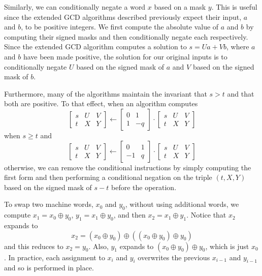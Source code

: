 \documentclass{ucalgthes1}
\theoremstyle{definition}
\newcommand{\matrixtt}[4]{\left[ \begin{array}{rr} #1 & #2 \\ #3 & #4 \end{array} \right]}
\newcommand{\matrixThreeTwo}[6]{\left[ \begin{array}{rrr} #1 & #2 & #3 \\ #4 & #5 & #6 \end{array} \right]}
\newcommand{\bxor}{\oplus}
\begin{document}
Similarly, we can conditionally negate a word $x$ based on a mask $y$.  This is useful since the extended GCD algorithms described previously expect their input, $a$ and $b$, to be positive integers.  We first compute the absolute value of $a$ and $b$ by computing their signed masks and then conditionally negate each respectively.  Since the extended GCD algorithm computes a solution to $s = Ua + Vb$, where $a$ and $b$ have been made positive, the solution for our original inputs is to conditionally negate $U$ based on the signed mask of $a$ and $V$ based on the signed mask of $b$.

Furthermore, many of the algorithms maintain the invariant that $s > t$ and that both are positive.  To that effect, when an algorithm computes
\[
 \matrixThreeTwo{s}{U}{V}{t}{X}{Y} \gets \matrixtt{0}{1}{1}{-q} \cdot \matrixThreeTwo{s}{U}{V}{t}{X}{Y}
\]
when $s \ge t$ and
\[
\matrixThreeTwo{s}{U}{V}{t}{X}{Y} \gets \matrixtt{0}{1}{-1}{q} \cdot \matrixThreeTwo{s}{U}{V}{t}{X}{Y}
\]
otherwise, we can remove the conditional instructions by simply computing the first form and then performing a conditional negation on the triple $(t, X, Y)$ based on the signed mask of $s-t$ before the operation.

To swap two machine words, $x_0$ and $y_0$, without using additional words, we compute $x_1 = x_0 \bxor y_0$, $y_1 = x_1 \bxor y_0$, and then $x_2 = x_1 \bxor y_1$.  Notice that $x_2$ expands to
\[
	x_2 = (x_0 \bxor y_0) \bxor ((x_0 \bxor y_0) \bxor y_0)
\]
and this reduces to $x_2 = y_0$.  Also, $y_1$ expands to $(x_0 \bxor y_0) \bxor y_0$, which is just $x_0$.  In practice, each assignment to $x_i$ and $y_i$ overwrites the previous $x_{i-1}$ and $y_{i-1}$ and so is performed in place.
\end{document}

